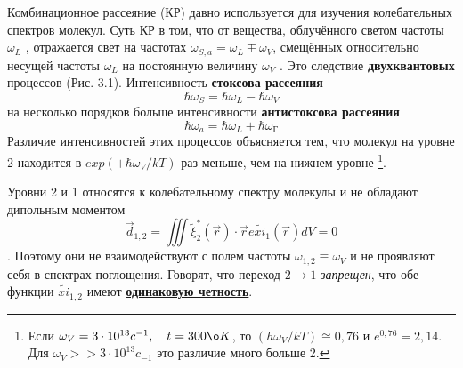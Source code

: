 \documentclass[a4paper]{article}
\begin{document}
Комбинационное рассеяние (КР) давно используется для изучения колебательных спектров молекул. Суть КР в том, что от вещества, облучённого светом частоты $\omega_{L}$ , отражается свет на частотах $\omega_{S,a}=\omega_{L}\mp\omega_{V}$, смещённых относительно несущей частоты $\omega_{L}$ на постоянную величину $\omega_{V}$ . Это следствие \textbf{двухквантовых} процессов (Рис. 3.1). Интенсивность \textbf{стоксова рассеяния}
\begin{equation}
	\hbar\omega_{S}=\hbar\omega_{L}-\hbar\omega_{V}\label{1.3.1}
\end{equation}
на несколько порядков больше интенсивности \textbf{антистоксова рассеяния}
\begin{equation}
	\hbar\omega_{a}=\hbar\omega_{L}+\hbar\omega_{\text{Г}}
	\tag{1'}\label{1.3.1'}
\end{equation}
\setcounter{footnote}{0}
Различие интенсивностей этих процессов объясняется тем, что молекул на уровне 2 находится в   $exp(+\hbar\omega_{V}/kT)$   раз меньше, чем на нижнем уровне \footnote{Если $\omega_{V}=3\cdot10^{13}c^{-1},\quad t=300\o K$, то $\left(h\omega_{V}/kT\right)\cong0,76$ и $e^{0,76}=2,14$. Для $\omega_{V}>>3\cdot10^{13}c_{-1}$ это различие много больше 2.}. 

Уровни 2 и 1 относятся к колебательному спектру молекулы и не обладают дипольным моментом $$\vec{d}_{1,2}=\iiint\tilde{\xi}_{2}^{*}\left(\vec{r}\right)\cdot\vec{r}e\tilde{xi}_{1}\left(\vec{r}\right)dV=0$$.
Поэтому они не взаимодействуют с полем частоты $\omega_{1,2}\equiv\omega_{V}$ и не проявляют себя в спектрах поглощения. Говорят, что переход $2 \rightarrow 1$ \textit{запрещен}, что обе функции $\tilde{xi}_{1,2}$   имеют \textbf{\underline{одинаковую четность}}. 
\end{document}
